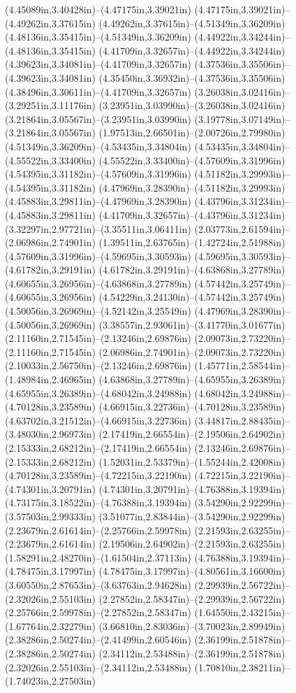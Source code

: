 (4.45089in,3.40428in)--(4.47175in,3.39021in) (4.47175in,3.39021in)--(4.49262in,3.37615in) (4.49262in,3.37615in)--(4.51349in,3.36209in) (4.48136in,3.35415in)--(4.51349in,3.36209in) (4.44922in,3.34244in)--(4.48136in,3.35415in) (4.41709in,3.32657in)--(4.44922in,3.34244in) (4.39623in,3.34081in)--(4.41709in,3.32657in) (4.37536in,3.35506in)--(4.39623in,3.34081in) (4.35450in,3.36932in)--(4.37536in,3.35506in) (4.38496in,3.30611in)--(4.41709in,3.32657in) (3.26038in,3.02416in)--(3.29251in,3.11176in) (3.23951in,3.03990in)--(3.26038in,3.02416in) (3.21864in,3.05567in)--(3.23951in,3.03990in) (3.19778in,3.07149in)--(3.21864in,3.05567in) (1.97513in,2.66501in)--(2.00726in,2.79980in) (4.51349in,3.36209in)--(4.53435in,3.34804in) (4.53435in,3.34804in)--(4.55522in,3.33400in) (4.55522in,3.33400in)--(4.57609in,3.31996in) (4.54395in,3.31182in)--(4.57609in,3.31996in) (4.51182in,3.29993in)--(4.54395in,3.31182in) (4.47969in,3.28390in)--(4.51182in,3.29993in) (4.45883in,3.29811in)--(4.47969in,3.28390in) (4.43796in,3.31234in)--(4.45883in,3.29811in) (4.41709in,3.32657in)--(4.43796in,3.31234in) (3.32297in,2.97721in)--(3.35511in,3.06411in) (2.03773in,2.61594in)--(2.06986in,2.74901in) (1.39511in,2.63765in)--(1.42724in,2.51988in) (4.57609in,3.31996in)--(4.59695in,3.30593in) (4.59695in,3.30593in)--(4.61782in,3.29191in) (4.61782in,3.29191in)--(4.63868in,3.27789in) (4.60655in,3.26956in)--(4.63868in,3.27789in) (4.57442in,3.25749in)--(4.60655in,3.26956in) (4.54229in,3.24130in)--(4.57442in,3.25749in) (4.50056in,3.26969in)--(4.52142in,3.25549in) (4.47969in,3.28390in)--(4.50056in,3.26969in) (3.38557in,2.93061in)--(3.41770in,3.01677in) (2.11160in,2.71545in)--(2.13246in,2.69876in) (2.09073in,2.73220in)--(2.11160in,2.71545in) (2.06986in,2.74901in)--(2.09073in,2.73220in) (2.10033in,2.56750in)--(2.13246in,2.69876in) (1.45771in,2.58544in)--(1.48984in,2.46965in) (4.63868in,3.27789in)--(4.65955in,3.26389in) (4.65955in,3.26389in)--(4.68042in,3.24988in) (4.68042in,3.24988in)--(4.70128in,3.23589in) (4.66915in,3.22736in)--(4.70128in,3.23589in) (4.63702in,3.21512in)--(4.66915in,3.22736in) (3.44817in,2.88435in)--(3.48030in,2.96973in) (2.17419in,2.66554in)--(2.19506in,2.64902in) (2.15333in,2.68212in)--(2.17419in,2.66554in) (2.13246in,2.69876in)--(2.15333in,2.68212in) (1.52031in,2.53379in)--(1.55244in,2.42008in) (4.70128in,3.23589in)--(4.72215in,3.22190in) (4.72215in,3.22190in)--(4.74301in,3.20791in) (4.74301in,3.20791in)--(4.76388in,3.19394in) (4.73175in,3.18522in)--(4.76388in,3.19394in) (3.54290in,2.92299in)--(3.57503in,2.99333in) (3.51077in,2.83844in)--(3.54290in,2.92299in) (2.23679in,2.61614in)--(2.25766in,2.59978in) (2.21593in,2.63255in)--(2.23679in,2.61614in) (2.19506in,2.64902in)--(2.21593in,2.63255in) (1.58291in,2.48270in)--(1.61504in,2.37113in) (4.76388in,3.19394in)--(4.78475in,3.17997in) (4.78475in,3.17997in)--(4.80561in,3.16600in) (3.60550in,2.87653in)--(3.63763in,2.94628in) (2.29939in,2.56722in)--(2.32026in,2.55103in) (2.27852in,2.58347in)--(2.29939in,2.56722in) (2.25766in,2.59978in)--(2.27852in,2.58347in) (1.64550in,2.43215in)--(1.67764in,2.32279in) (3.66810in,2.83036in)--(3.70023in,2.89949in) (2.38286in,2.50274in)--(2.41499in,2.60546in) (2.36199in,2.51878in)--(2.38286in,2.50274in) (2.34112in,2.53488in)--(2.36199in,2.51878in) (2.32026in,2.55103in)--(2.34112in,2.53488in) (1.70810in,2.38211in)--(1.74023in,2.27503in) 